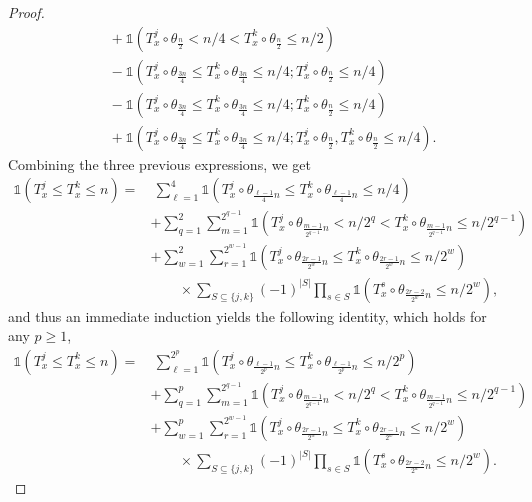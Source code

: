 \documentclass[10pt,a4paper]{amsart}
\newcommand{\1}{\mathds{1}}
\numberwithin{equation}{section}
\begin{document}
\begin{proof}
\begin{align*}
        &\hspace{1em}+\1\left(T_x^j\circ\theta_{\frac n2}<n/4<T_x^k\circ\theta_{\frac n2}\le n/2\right)\\
        &\hspace{1em}-\1\left(T_x^j\circ\theta_{\frac {3n}4}\le T_x^k\circ\theta_{\frac{3n}4}\le n/4; T_x^j\circ\theta_{\frac n2}\le n/4\right)\\
        &\hspace{1em}-\1\left(T_x^j\circ\theta_{\frac{3n}4}\le T_x^k\circ\theta_{\frac{3n}4}\le n/4; T_x^k\circ\theta_{\frac n2}\le n/4\right)\\
        &\hspace{1em}+\1\left(T_x^j\circ\theta_{\frac{3n}4}\le T_x^k\circ\theta_{\frac{3n}4}\le n/4; T_x^j\circ\theta_{\frac n2},T_x^k\circ\theta_{\frac n2}\le n/4\right).
    \end{align*}
    Combining the three previous expressions, we get
    \begin{align*}
        \1\left(T_x^j\le T_x^k\le n\right)=&\ \sum_{\ell=1}^{4}\1\left(T_x^j\circ\theta_{\frac{\ell-1}{4}n}\le T_x^k\circ\theta_{\frac{\ell-1}{4}n}\le n/4\right)\\
        &+\sum_{q=1}^2\sum_{m=1}^{2^{q-1}}\1\left(T_x^j\circ\theta_{\frac{m-1}{2^{q-1}}n}<n/2^q<T_x^k\circ\theta_{\frac{m-1}{2^{q-1}}n}\le n/2^{q-1}\right)\\
        &+\sum_{w=1}^2\sum_{r=1}^{2^{w-1}}\1\left(T_x^j\circ \theta_{\frac{2r-1}{2^w}n}\le T_x^k\circ\theta_{\frac{2r-1}{2^w}n}\le n/2^w\right)\\
        &\quad\quad\times\sum_{S\subseteq\{j,k\}}(-1)^{|S|}\prod_{s\in S}\1\left(T_x^s\circ\theta_{\frac{2r-2}{2^w}n}\le n/2^w\right),
    \end{align*}
    and thus an immediate induction yields the following identity, which holds for any $p\ge1$,
    \begin{align*}
        \1\left(T_x^j\le T_x^k\le n\right)=&\ \sum_{\ell=1}^{2^p}\1\left(T_x^j\circ\theta_{\frac{\ell-1}{2^p}n}\le T_x^k\circ\theta_{\frac{\ell-1}{2^p}n}\le n/2^p\right)\\
        &+\sum_{q=1}^p\sum_{m=1}^{2^{q-1}}\1\left(T_x^j\circ\theta_{\frac{m-1}{2^{q-1}}n}<n/2^q<T_x^k\circ\theta_{\frac{m-1}{2^{q-1}}n}\le n/2^{q-1}\right)\\
        &+\sum_{w=1}^p\sum_{r=1}^{2^{w-1}}\1\left(T_x^j\circ \theta_{\frac{2r-1}{2^w}n}\le T_x^k\circ\theta_{\frac{2r-1}{2^w}n}\le n/2^w\right)\\
        &\quad\quad\times\sum_{S\subseteq\{j,k\}}(-1)^{|S|}\prod_{s\in S}\1\left(T_x^s\circ\theta_{\frac{2r-2}{2^w}n}\le n/2^w\right).

\end{align*}
\end{proof}
\end{document}
